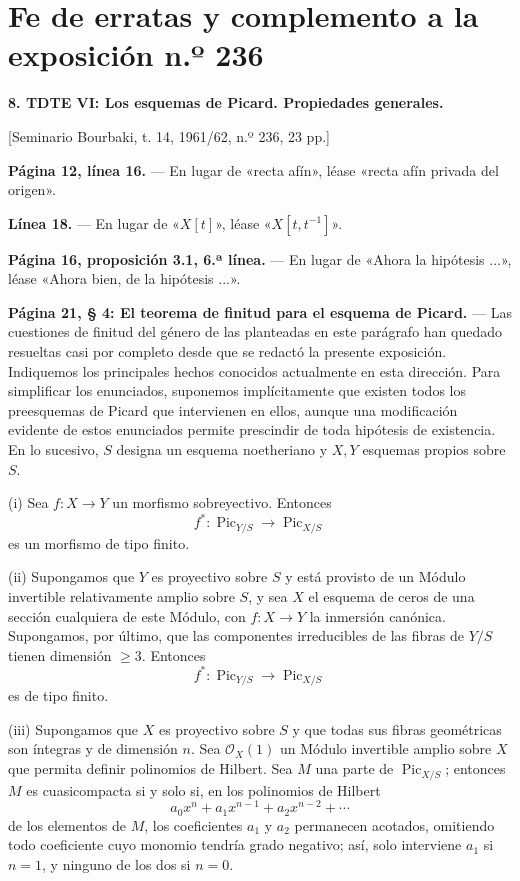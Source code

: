 \clearpage
\chapter*{Fe de erratas y complemento a la exposición n.º 236}

\noindent\textbf{8. TDTE VI: Los esquemas de Picard. Propiedades generales.}

\begin{center}
[Seminario Bourbaki, t. 14, 1961/62, n.º 236, 23 pp.]
\end{center}

\noindent\textbf{Página 12, línea 16.} --- En lugar de «recta afín», léase
«recta afín privada del origen».

\noindent\textbf{Línea 18.} --- En lugar de «$X[t]$», léase
«$X[t,t^{-1}]$».

\noindent\textbf{Página 16, proposición 3.1, 6.ª línea.} --- En lugar de «Ahora
la hipótesis ...», léase «Ahora bien, de la hipótesis ...».

\noindent\textbf{Página 21, § 4: El teorema de finitud para el esquema de
Picard.} --- Las cuestiones de finitud del género de las planteadas en este
parágrafo han quedado resueltas casi por completo desde que se redactó la
presente exposición. Indiquemos los principales hechos conocidos actualmente
en esta dirección. Para simplificar los enunciados, suponemos implícitamente
que existen todos los preesquemas de Picard que intervienen en ellos, aunque
una modificación evidente de estos enunciados permite prescindir de toda
hipótesis de existencia. En lo sucesivo, $S$ designa un esquema noetheriano y
$X,Y$ esquemas propios sobre $S$.

\medskip
\noindent(i) Sea $f:X\longrightarrow Y$ un morfismo sobreyectivo. Entonces
\[
f^*: \operatorname{Pic}_{Y/S}\longrightarrow\operatorname{Pic}_{X/S}
\]
es un morfismo de tipo finito.

\noindent(ii) Supongamos que $Y$ es proyectivo sobre $S$ y está provisto de un
Módulo invertible relativamente amplio sobre $S$, y sea $X$ el esquema de ceros
de una sección cualquiera de este Módulo, con $f:X\longrightarrow Y$ la inmersión
canónica. Supongamos, por último, que las componentes irreducibles de las
fibras de $Y/S$ tienen dimensión $\geq3$. Entonces
\[
f^*: \operatorname{Pic}_{Y/S}\longrightarrow\operatorname{Pic}_{X/S}
\]
es de tipo finito.

\noindent(iii) Supongamos que $X$ es proyectivo sobre $S$ y que todas sus
fibras geométricas son íntegras y de dimensión $n$. Sea $\mathcal O_X(1)$ un
Módulo invertible amplio sobre $X$ que permita definir polinomios de Hilbert. Sea
$M$ una parte de $\operatorname{Pic}_{X/S}$; entonces $M$ es cuasicompacta si
y solo si, en los polinomios de Hilbert
\[
a_0x^n+a_1x^{n-1}+a_2x^{n-2}+\cdots
\]
de los elementos de $M$, los coeficientes $a_1$ y $a_2$ permanecen acotados, omitiendo todo coeficiente cuyo monomio tendría grado negativo; así, solo interviene $a_1$ si $n=1$, y ninguno de los dos si $n=0$.

